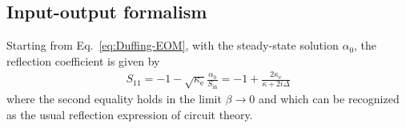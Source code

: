 
\subsection{Input-output formalism}\label{app:inputoutput}

Starting from Eq.~\eqref{eq:Duffing-EOM}, with the steady-state solution $\alpha_0$, the reflection coefficient is given by
% 
\begin{align}
S_{11}=-1-\sqrt{\kappa_\text{e}}\frac{\alpha_0}{S_\text{in}}=-1+\frac{2\kappa_\text{e}}{\kappa+2i\Delta}
\end{align}
% 
where the second equality holds in the limit $\beta\rightarrow 0$ and which can be recognized as the usual reflection expression of circuit theory.


